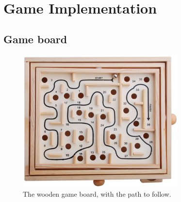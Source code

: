 
\section{Game Implementation}\label{sec:game-implementation}

\subsection{Game board}\label{subsec:game-board}

\begin{figure}[h]
    \includegraphics[width=0.75\textwidth]{images/wooden_game_board}
    \caption{The wooden game board, with the path to follow.}
    \label{fig:wooden_board}
\end{figure}